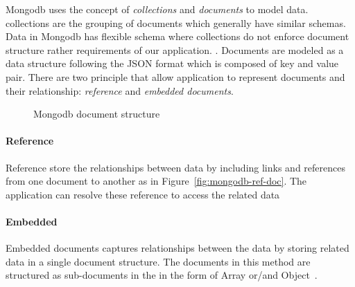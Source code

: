 
Mongodb uses the concept of \textit{collections} and \textit{documents} to model data. collections are the grouping of documents which generally have similar schemas. Data in Mongodb has flexible schema where collections do not enforce document structure rather requirements of our application. .  Documents are modeled as a data structure following the JSON format which is composed of key and value pair. There are two principle that allow application to represent documents and their relationship: \textit{reference} and \textit{embedded documents}. 
\begin{figure}
	\centering
	\centering
	\caption{Mongodb document structure}
	\label{fig:mongodb-doc}
	 
\end{figure}

\paragraph{Reference}
	Reference store the relationships between data by including links and references from one document to another as in  Figure~\ref{fig:mongodb-ref-doc}. The application can resolve these reference to access the related data
\paragraph{Embedded}
	Embedded documents captures relationships between the data by storing related data in a single document structure. The documents in this method are structured as sub-documents in the in the form of Array or/and Object~\cite{nosql/comparision}. 
	
